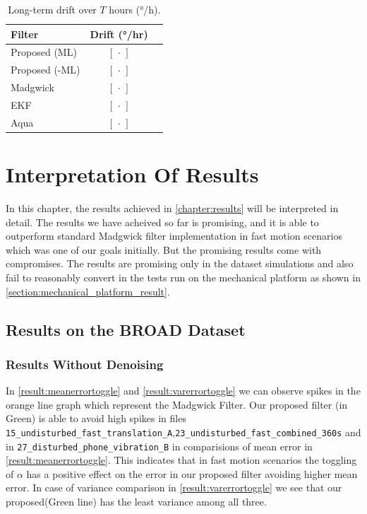 \documentclass{iutbscthesis}
\begin{document}
\begin{table}[H]
  \centering
  \caption{Long-term drift over \(T\) hours (°/h).}
  \label{tab:long_term_drift}
  \begin{tabular}{lcc}
    \toprule
    Filter & Drift (°/hr) \\
    \midrule
    Proposed (ML)     & \([\,\cdot\,]\) \\
    Proposed (-ML)    & \([\,\cdot\,]\) \\
    Madgwick           & \([\,\cdot\,]\) \\
    EKF                & \([\,\cdot\,]\) \\
    Aqua               & \([\,\cdot\,]\) \\
    \bottomrule
  \end{tabular}
\end{table}




\chapter{Interpretation Of Results} \label{chapter:discussion}

In this chapter, the results achieved in \autoref{chapter:results} will be interpreted in detail. The results we have acheived so far is promising, and it is able to outperform standard Madgwick filter implementation in fast motion scenarios which was one of our goals initially. But the promising results come with compromises. The results are promising only in the dataset simulations and also fail 
to reasonably convert in the tests run on the mechanical platform as shown in \autoref{section:mechanical_platform_result}. 

\section{Results on the BROAD Dataset}
\subsection{Results Without Denoising}
In \autoref{result:meanerrortoggle} and \autoref{result:varerrortoggle} we can observe spikes in the orange line graph
which represent the Madgwick Filter. Our proposed filter (in Green) is able to avoid high spikes in files \texttt{15\_undisturbed\_fast\_translation\_A},\texttt{23\_undisturbed\_fast\_combined\_360s} and in \texttt{27\_disturbed\_phone\_vibration\_B} 
in comparisions of mean error in \autoref{result:meanerrortoggle}. This indicates that in fast motion scenarios the toggling of $\alpha$ 
has a positive effect on the error in our proposed filter avoiding higher mean error. In case of variance comparison
in \autoref{result:varerrortoggle} we see that our proposed(Green line) has the least variance among all three.
\end{document}
